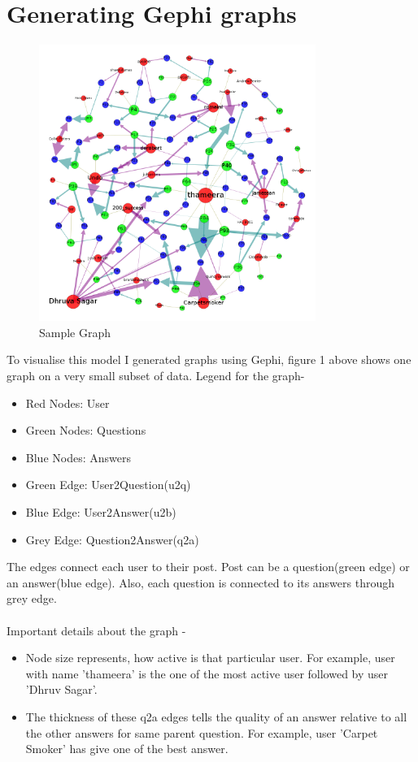 \documentclass{article}
\begin{document}
\section{Generating Gephi graphs}
\begin{figure}[h]
\centering
\includegraphics[width=9cm]{proposalimg.png}
\caption{Sample Graph}
\label{fig1:overview}
\end{figure}
To visualise this model I generated graphs using Gephi, figure 1 above
shows one graph on a very small subset of data. Legend for the graph-
\begin{itemize}
    \item Red Nodes: User
    \item Green Nodes: Questions
    \item Blue Nodes: Answers
    \item Green Edge: User2Question(u2q)
    \item Blue Edge: User2Answer(u2b)
    \item Grey Edge: Question2Answer(q2a)
\end{itemize}
The edges connect each user to their post.
Post can be a question(green edge) or an answer(blue edge).
Also, each question is connected to its answers through grey edge.\\
\\
Important details about the graph -
\begin{itemize}
    \item Node size represents, how active is that particular user. For example, user
        with name 'thameera' is the one of the most active user followed by user
        'Dhruv Sagar'.
    \item The thickness of these q2a edges tells the quality of an answer relative to 
all the other answers for same parent question. For example, user 'Carpet Smoker' has
        give one of the best answer.
\end{itemize}
\end{document}
